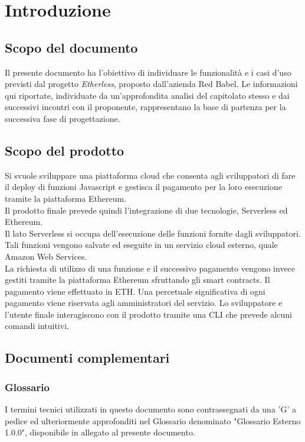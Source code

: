 \section{Introduzione}
\subsection{Scopo del documento}
	Il presente documento ha l'obiettivo di individuare le funzionalità e i casi d'uso previsti dal progetto \textit{Etherless}, proposto dall'azienda Red Babel. Le informazioni qui riportate, individuate da un'approfondita analisi del capitolato stesso e dai successivi incontri con il proponente, rappresentano la base di partenza per la successiva fase di progettazione.

\subsection{Scopo del prodotto}
	Si svuole sviluppare una piattaforma cloud che consenta agli sviluppatori di fare il deploy di funzioni Javascript e gestisca il pagamento per la loro esecuzione tramite la piattaforma Ethereum.\\
	Il prodotto finale prevede quindi l'integrazione di due tecnologie, Serverless ed Ethereum.\\
	Il lato Serverless si occupa dell'esecuzione delle funzioni fornite dagli sviluppatori. Tali funzioni vengono salvate ed eseguite in un servizio cloud esterno, quale Amazon Web Services.  \\La richiesta di utilizzo di una funzione e il successivo pagamento vengono invece gestiti tramite la piattaforma Ethereum sfruttando gli smart contracts. Il pagamento viene effettuato in ETH. Una percetuale significativa di ogni pagamento viene riservata agli amministratori del servizio. 
	Lo sviluppatore e l'utente finale interagiscono con il prodotto tramite una CLI che prevede alcuni comandi intuitivi.

\subsection{Documenti complementari}
\subsubsection{Glossario}
	I termini tecnici utilizzati in questo documento sono contrassegnati da una ’G’ a pedice ed ulteriormente approfonditi nel Glossario denominato "Glossario Esterno 1.0.0", disponibile in allegato al presente documento.


